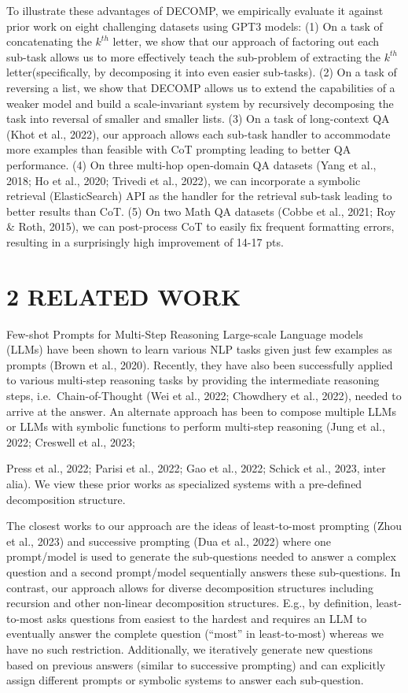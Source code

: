 \documentclass[
]{article}
\begin{document}
To illustrate these advantages of DECOMP, we empirically evaluate it
against prior work on eight challenging datasets using GPT3 models: (1)
On a task of concatenating the \(k^{th}\) letter, we show that our
approach of factoring out each sub-task allows us to more effectively
teach the sub-problem of extracting the \(k^{th}\) letter(specifically,
by decomposing it into even easier sub-tasks). (2) On a task of
reversing a list, we show that DECOMP allows us to extend the
capabilities of a weaker model and build a scale-invariant system by
recursively decomposing the task into reversal of smaller and smaller
lists. (3) On a task of long-context QA (Khot et al., 2022), our
approach allows each sub-task handler to accommodate more examples than
feasible with CoT prompting leading to better QA performance. (4) On
three multi-hop open-domain QA datasets (Yang et al., 2018; Ho et al.,
2020; Trivedi et al., 2022), we can incorporate a symbolic retrieval
(ElasticSearch) API as the handler for the retrieval sub-task leading to
better results than CoT. (5) On two Math QA datasets (Cobbe et al.,
2021; Roy \& Roth, 2015), we can post-process CoT to easily fix frequent
formatting errors, resulting in a surprisingly high improvement of 14-17
pts.

\section{2 RELATED WORK}\label{related-work}

Few-shot Prompts for Multi-Step Reasoning Large-scale Language models
(LLMs) have been shown to learn various NLP tasks given just few
examples as prompts (Brown et al., 2020). Recently, they have also been
successfully applied to various multi-step reasoning tasks by providing
the intermediate reasoning steps, i.e.~Chain-of-Thought (Wei et al.,
2022; Chowdhery et al., 2022), needed to arrive at the answer. An
alternate approach has been to compose multiple LLMs or LLMs with
symbolic functions to perform multi-step reasoning (Jung et al., 2022;
Creswell et al., 2023;

Press et al., 2022; Parisi et al., 2022; Gao et al., 2022; Schick et
al., 2023, inter alia). We view these prior works as specialized systems
with a pre-defined decomposition structure.

The closest works to our approach are the ideas of least-to-most
prompting (Zhou et al., 2023) and successive prompting (Dua et al.,
2022) where one prompt/model is used to generate the sub-questions
needed to answer a complex question and a second prompt/model
sequentially answers these sub-questions. In contrast, our approach
allows for diverse decomposition structures including recursion and
other non-linear decomposition structures. E.g., by definition,
least-to-most asks questions from easiest to the hardest and requires an
LLM to eventually answer the complete question (``most'' in
least-to-most) whereas we have no such restriction. Additionally, we
iteratively generate new questions based on previous answers (similar to
successive prompting) and can explicitly assign different prompts or
symbolic systems to answer each sub-question.
\end{document}

